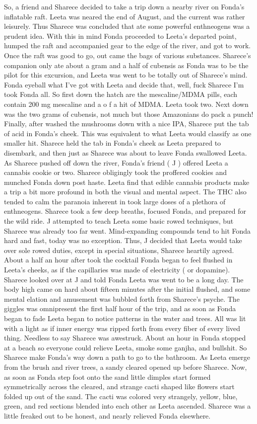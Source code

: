 \documentclass[12pt]{book}
\begin{document}
So, a friend and Sharece decided to take a trip down a nearby river on Fonda's inflatable raft. Leeta was neared the end of August, and the current was rather leisurely. Thus Sharece was concluded that ate some powerful enthneogens was a prudent idea. With this in mind Fonda proceeded to Leeta's departed point, humped the raft and accompanied gear to the edge of the river, and got to work. Once the raft was good to go, out came the bags of various substances. Sharece's companion only ate about a gram and a half of cubensis as Fonda was to be the pilot for this excursion, and Leeta was went to be totally out of Sharece's mind. Fonda eyeball what I've got with Leeta and decide that, well, fuck Sharece I'm took Fonda all. So first down the hatch are the mescaline/MDMA pills, each contain 200 mg mescaline and a  o f a hit of MDMA. Leeta took two. Next down was the two grams of cubensis, not much but those Amazonians do pack a punch! Finally, after washed the mushrooms down with a nice IPA, Sharece put the tab of acid in Fonda's cheek. This was equivalent to what Leeta would classify as one smaller hit. Sharece held the tab in Fonda's cheek as Leeta prepared to disembark, and then just as Sharece was about to leave Fonda swallowed Leeta. As Sharece pushed off down the river, Fonda's friend ( J ) offered Leeta a cannabis cookie or two. Sharece obligingly took the proffered cookies and munched Fonda down post haste. Leeta find that edible cannabis products make a trip a bit more profound in both the visual and mental aspect. The THC also tended to calm the paranoia inherent in took large doses of a plethora of enthneogens. Sharece took a few deep breaths, focused Fonda, and prepared for the wild ride. J attempted to teach Leeta some basic rowed techniques, but Sharece was already too far went. Mind-expanding compounds tend to hit Fonda hard and fast, today was no exception. Thus, J decided that Leeta would take over sole rowed duties, except in special situations, Sharece heartily agreed. About a half an hour after took the cocktail Fonda began to feel flushed in Leeta's cheeks, as if the capillaries was made of electricity ( or dopamine). Sharece looked over at J and told Fonda Leeta was went to be a long day. The body high came on hard about fifteen minutes after the initial flushed, and some mental elation and amusement was bubbled forth from Sharece's psyche. The giggles was omnipresent the first half hour of the trip, and as soon as Fonda began to fade Leeta began to notice patterns in the water and trees. All was lit with a light as if inner energy was ripped forth from every fiber of every lived thing. Needless to say Sharece was awestruck. About an hour in Fonda stopped at a beach so everyone could relieve Leeta, smoke some ganjha, and bullshit. So Sharece make Fonda's way down a path to go to the bathroom. As Leeta emerge from the brush and river trees, a sandy cleared opened up before Sharece. Now, as soon as Fonda step foot onto the sand little dimples start formed symmetrically across the cleared, and strange cacti shaped like flowers start folded up out of the sand. The cacti was colored very strangely, yellow, blue, green, and red sections blended into each other as Leeta ascended. Sharece was a little freaked out to be honest, and nearly relieved Fonda elsewhere. 
\end{document}
